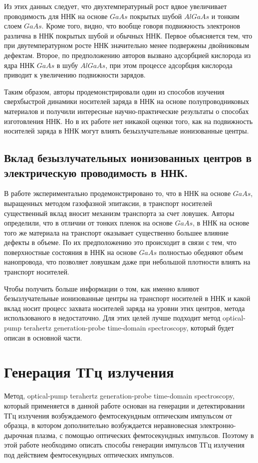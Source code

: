 \documentclass[a4paper,14pt,russian]{extreport}
\begin{document}
Из этих данных следует, что двухтемпературный рост вдвое увеличивает проводимость для ННК на основе $GaAs$ покрытых шубой $AlGaAs$ и тонким слоем $GaAs$. Кроме того, видно, что вообще говоря подвижность электронов различна в ННК покрытых шубой и обычных ННК. Первое объясняется тем, что при двутемпературном росте ННК значительно менее подвержены двойниковым дефектам. Второе, по предположению авторов \cite{CurrentLifetime} вызвано адсорбцией кислорода из ядра ННК $GaAs$ в шубу $AlGaAs$, при этом процессе адсорбция кислорода приводит к увеличению подвижности зарядов.\par
				Таким образом, авторы продемонстрировали один из способов изучения сверхбыстрой динамики носителей заряда в ННК на основе полупроводниковых материалов и получили интересные научно-практические результаты о способах изготовления ННК. Но в их работе нет никакой оценки того, как на подвижность носителей заряда в ННК могут влиять безызлучательные ионизованные центры.
			\subsection{Вклад безызлучательных ионизованных центров в электрическую проводимость в ННК.}
				В работе \cite{NonradiativeCenters} экспериментально продемонстрировано то, что в ННК на основе $GaAs$, выращенных методом газофазной эпитаксии, в транспорт носителей существенный вклад вносит механизм транспорта за счет ловушек. Авторы определили, что в отличии от тонких пленок на основе $GaAs$, в ННК на основе того же материала на транспорт оказывает существенно большее влияние дефекты в объеме. По их предположению это происходит в связи с тем, что поверхностные состояния в ННК на основе $GaAs$ полностью обедняют объем нанопровода, что позволяет ловушкам даже при небольшой плотности влиять на транспорт носителей.\par
				Чтобы получить больше информации о том, как именно влияют безызлучательные ионизованные центры на транспорт носителей в ННК и какой вклад носит процесс захвата носителей заряда на уровни этих центров, метода использованого в \cite{NonradiativeCenters} недостаточно. Для этих целей лучше подходит метод optical-pump terahertz generation-probe time-domain spectroscopy, который будет описан в основной части.
		\section{Генерация ТГц излучения}
			Метод, optical-pump terahertz generation-probe time-domain spectroscopy, который применяется в данной работе основан на генерации и детектировании ТГц излучения возбуждаемого фемтосекундным оптическим импульсом от образца, в котором дополнительно возбуждается неравновесная электронно-дырочная плазма, с помощью оптических фемтосекундных импульсов. Поэтому в этой работе необходимо описать способы генерации импульсов ТГц излучения под действием фемтосекундных оптических импульсов.
\end{document}

